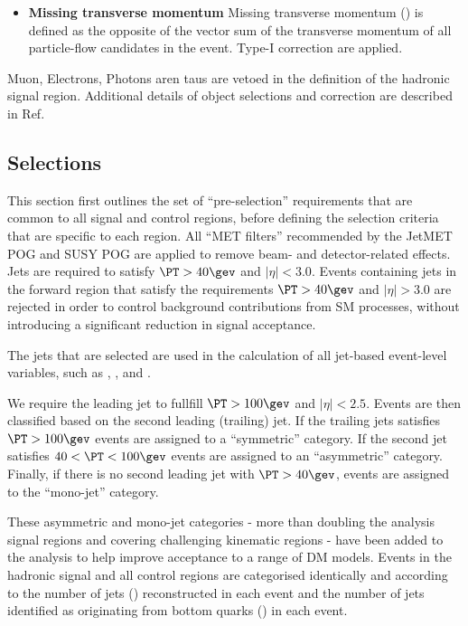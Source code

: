 \begin{itemize}
 \item{\bf Missing transverse momentum} Missing transverse momentum (\met) is defined as the opposite of the vector sum of the transverse momentum of all particle-flow candidates in the event. Type-I \met correction \cite{Khachatryan:2014gga} are applied.


\end{itemize}


Muon, Electrons, Photons aren taus are vetoed in the definition of the hadronic signal region. Additional details of object selections and correction are described in Ref.~\cite{alphaTnote}

\subsection{Selections}


This section first outlines the set of ``pre-selection'' requirements that are common to all signal and control regions, before defining the
selection criteria that are specific to each region. 
All ``MET filters'' recommended by the JetMET POG and SUSY POG are applied to remove beam- and detector-related effects. 
Jets are required to satisfy $\PT>40\gev$ and $|\eta|<3.0$. Events containing jets in the forward region that
satisfy the requirements $\PT>40\gev$ and $|\eta|>3.0$ are rejected in order to control background contributions from SM processes, without
introducing a significant reduction in signal acceptance. 

The jets that are selected are used in the calculation of all jet-based event-level variables, such as \HT, \mht, and \alphat.

We require the leading jet to fullfill $\PT > 100\gev$ and $|\eta|<2.5$.  Events are then classified based on the second leading (trailing) jet. 
If the trailing jets satisfies $\PT > 100\gev$  events are assigned to a ``symmetric'' \njet category. If the second
jet satisfies $40 < \PT < 100\gev$ events are assigned to an ``asymmetric'' \njet category. Finally, if there is no second leading
jet with $\PT>40\gev$, events are assigned to the ``mono-jet'' category. 

These asymmetric and mono-jet categories - more than doubling the analysis signal regions and covering challenging kinematic regions - have been added to the analysis to help improve acceptance to a range of DM models. Events in the hadronic signal and all control regions are categorised identically and according to the number of jets (\njet) reconstructed in each event and the number of jets identified as originating from bottom quarks (\nb) in each event. 

